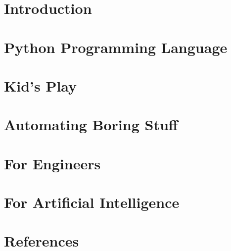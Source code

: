 \section[Intro]{Introduction}


\section[Syntax]{Python Programming Language}

 
\section[Kids]{Kid's Play}



\section[Auto]{Automating Boring Stuff}


\section[Eng]{For Engineers}


 
\section[AI]{For Artificial Intelligence}


 \section[Refs]{References}


